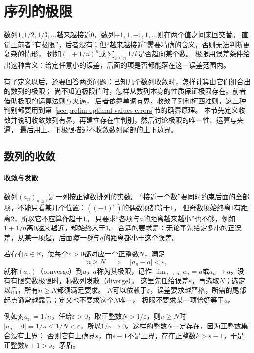 \section{序列的极限}
\label{sec:analysis-continuous-limits}

数列$1,1/2,1/3,\ldots$越来越接近$0$，数列$-1,1,-1,1,\ldots$则在两个值之间来回交替。
直觉上前者“有极限”，后者没有；但“越来越接近”需要精确的含义，否则无法判断更复杂的情形，
例如$(1+1/n)^n$或$\sum_{k\leq n}1/k$是否趋向某个数。
极限用误差条件给出这种含义：给定任意小的误差，后面的项是否都能落在这一误差范围内。

\label{sec:analysis-sequences-series-errors}

有了定义以后，还要回答两类问题：已知几个数列收敛时，怎样计算由它们组合出的数列的极限；
尚不知道极限值时，怎样从数列本身的性质保证极限存在。前者借助极限的运算法则与夹逼，
后者依靠单调有界、收敛子列和柯西准则，这三种判别都要用到第~\ref{sec:prelim-optimal-values-errors}节的确界原理。
本节先定义收敛并说明收敛数列有界，再建立存在性判别，然后讨论极限的唯一性、运算与夹逼，
最后用上、下极限描述不收敛数列尾部的上下边界。

\subsection{数列的收敛}

\paragraph{收敛与发散}
数列$(a_n)_{n\geq1}$是一列按正整数排列的实数。
“接近一个数”要同时约束后面的全部项，不能只看某几个位置：$((-1)^n)$的偶数项都等于$1$，
但奇数项始终离$1$有距离$2$，所以它不应算作趋于$1$。
只要求“各项与$a$的距离越来越小”也不够，例如$1+1/n$离$0$越来越近，却始终大于$1$。
合适的要求是：无论事先给定多小的正误差，从某一项起，后面\emph{每一项}与$a$的距离都小于这个误差。

若存在$a\in\mathbb R$，使每个$\varepsilon>0$都对应一个正整数$N$，满足
\[
 n\geq N\quad\Longrightarrow\quad |a_n-a|<\varepsilon,
\]
就称$(a_n)$（converge）到$a$，$a$称为其极限，记作
$\lim_{n\to\infty}a_n=a$或$a_n\to a$。没有有限实数极限时，称数列发散（diverge）。
这里先任给误差$\varepsilon$，再选取$N$；选定以后，所有$n\geq N$都须满足要求。
$N$可以依赖于$\varepsilon$，误差要求越严格，所需的尾部起点通常越靠后；定义也不要求这个$N$唯一。
极限不要求某一项恰好等于$a$。

例如对$a_n=1/n$，任给$\varepsilon>0$，取正整数$N>1/\varepsilon$，则$n\geq N$时
$|a_n-0|=1/n\leq1/N<\varepsilon$，所以$1/n\to0$。这样的整数$N$一定存在，因为正整数集合没有上界：
否则它有上确界$s$，而$s-1$不是上界，存在正整数$k>s-1$，于是正整数$k+1>s$，矛盾。

